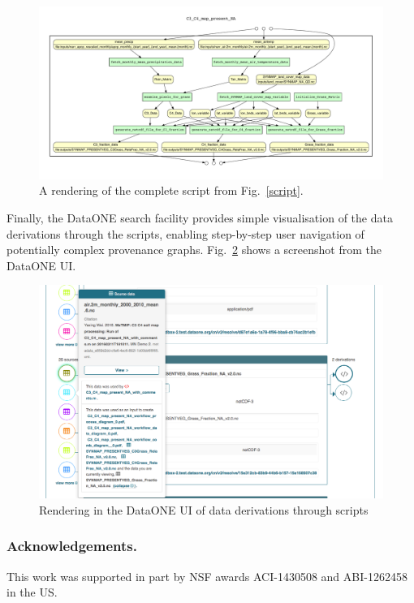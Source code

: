 \documentclass[a4paper]{llncs}
\begin{document}
\begin{figure}
\centering 
\includegraphics[width=\textwidth]{C3_C4_map_present_NA_workflow_comb_diagram} 
\caption{A rendering of the complete script from Fig.~\ref{script}.} 
 \label{yw-graph} 
 \end{figure}

Finally, the DataONE search facility provides simple visualisation of the data derivations through the scripts, enabling step-by-step user navigation of potentially complex provenance graphs. Fig.~\ref{UI} shows a screenshot from the DataONE UI.

\begin{figure}
\centering 
\includegraphics[width=\textwidth]{UI-screenshot-derivations} 
\caption{Rendering in the DataONE UI of data derivations through scripts}
 \label{UI} 
 \end{figure}

\subsubsection*{Acknowledgements.}

This work was supported in part by NSF awards ACI-1430508 and ABI-1262458 in the US.



\end{document}
